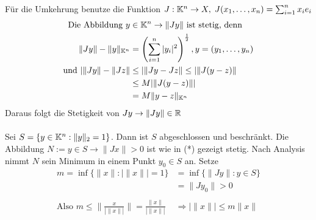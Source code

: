 \begin{beweis}
	Für die Umkehrung benutze die Funktion $J: \mathbb{K}^{n} \rightarrow X, \hspace{0.1cm} J(x_{1}, \dotsc, x_{n}) = \sum_{i = 1}^{n} x_{i} e_{i} $ \\
	\begin{align*}
 	 \text{Die Abbildung } y & \in \mathbb{K}^{n}  \rightarrow \| Jy \| \text{ ist stetig, denn} \\
 	 	 \| Jy \| - \| y \|_{\mathbb{K}^{n}} & = \left( \sum_{i = 1}^{n} |y_{i}|^{2} \right)^{\frac{1}{2}}, y = (y_{1}, \dotsc, y_{n}) \\
 	 	 \text{und } | \| Jy \| - \| Jz \| & \leq | \| Jy - Jz \| \leq | \| J(y - z) \| \\
 	 	 & \leq M |\|J (y - z) \|| \\
 	 	 & = M \| y - z \|_{\mathbb{K}^{n}} \\
 	 \end{align*}
 Daraus folgt die Stetigkeit von $ Jy \rightarrow \| Jy \| \in \mathbb{R} $ \\ \\
	Sei $S = \{y \in \mathbb{K}^{n}: \| y \|_2 = 1 \}$. Dann ist $S$ abgeschlossen und beschränkt.
	Die Abbildung $N := y \in S \rightarrow \| Jx \| > 0$ ist wie in (*) gezeigt stetig. Nach Analysis nimmt $N$ sein Minimum in einem Punkt $y_{0} \in S$ an. Setze
		\begin{align*}
			m = \inf\{\| x \| : |\| x \|| = 1\} & = \inf \{ \| Jy \|: y \in S \} \\
												& = \| J y_{0} \| > 0 \\ \\
			\text{Also } m \leq \| \frac{x}{ |\| x \|| } \| =  \frac{ \| x \| }{ |\| x \|| }  &\Rightarrow |\| x \|| \leq m \| x \|
		\end{align*}
\end{beweis}

